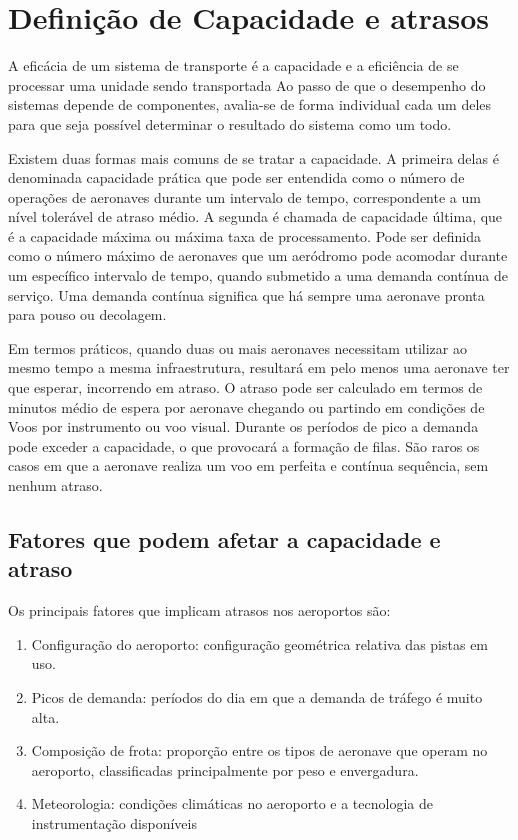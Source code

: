 \documentclass[12pt]{article}
\begin{document}
  \section{Definição de Capacidade e atrasos}
  
  A eficácia de um sistema de transporte é a capacidade e a eficiência de
  se processar uma unidade sendo transportada Ao passo de que o desempenho
  do sistemas depende de componentes, avalia-se de forma individual cada
  um deles para que seja possível determinar o resultado do sistema como 
  um todo. 
  
  Existem duas formas mais comuns de se tratar a capacidade. A primeira delas
  é denominada capacidade prática que pode ser entendida como o número de 
  operações de aeronaves durante um intervalo de tempo, correspondente a um
  nível tolerável de atraso médio. A segunda é chamada de capacidade última,
  que é a capacidade máxima ou máxima taxa de processamento. Pode ser 
  definida como o número máximo de aeronaves que um aeródromo pode acomodar
  durante um específico intervalo de tempo, quando submetido a uma demanda
  contínua de serviço. Uma demanda contínua significa que há sempre uma 
  aeronave pronta para pouso ou decolagem. 
  
  Em termos práticos, quando duas ou mais aeronaves necessitam utilizar ao
  mesmo tempo a mesma infraestrutura, resultará em pelo menos uma aeronave 
  ter que esperar, incorrendo em atraso. O atraso pode ser calculado em termos
  de minutos médio de espera por aeronave chegando ou partindo em condições 
  de Voos por instrumento ou voo visual. Durante os períodos de pico a demanda
  pode exceder a capacidade, o que provocará a formação de filas. São raros
  os casos em que a aeronave realiza um voo em perfeita e contínua sequência,
  sem nenhum atraso. 
  
  \subsection{Fatores que podem afetar a capacidade e atraso}
  
  Os principais fatores que implicam atrasos nos aeroportos são:
  
  
  \begin{enumerate}
    
    \item Configuração do aeroporto: configuração geométrica relativa das pistas 
      em uso.
  
    \item Picos de demanda: períodos do dia em que a demanda de tráfego é muito
      alta.
  
    \item Composição de frota: proporção entre os tipos de aeronave que operam no 
    aeroporto, classificadas principalmente por peso e envergadura.
  
    \item Meteorologia: condições climáticas no aeroporto e a tecnologia de 
    instrumentação disponíveis
  
  \end{enumerate}
  
\end{document}
